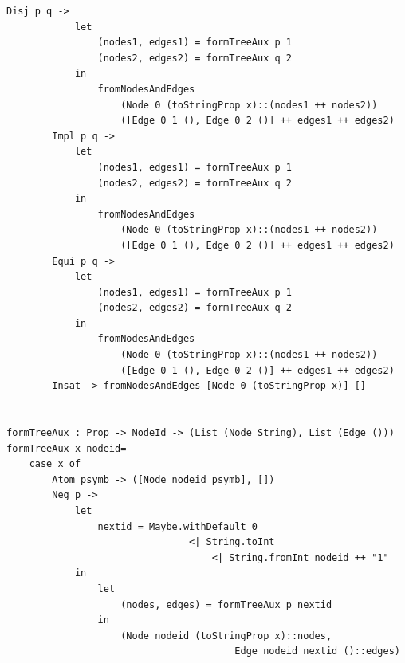 \documentclass[a4paper]{report}
\begin{document}
\begin{lstlisting}[caption={Módulo SintaxSemanticsLP}, mathescape=true]
        Disj p q -> 
            let 
                (nodes1, edges1) = formTreeAux p 1
                (nodes2, edges2) = formTreeAux q 2
            in
                fromNodesAndEdges 
                    (Node 0 (toStringProp x)::(nodes1 ++ nodes2)) 
                    ([Edge 0 1 (), Edge 0 2 ()] ++ edges1 ++ edges2)
        Impl p q -> 
            let 
                (nodes1, edges1) = formTreeAux p 1
                (nodes2, edges2) = formTreeAux q 2
            in
                fromNodesAndEdges 
                    (Node 0 (toStringProp x)::(nodes1 ++ nodes2)) 
                    ([Edge 0 1 (), Edge 0 2 ()] ++ edges1 ++ edges2)
        Equi p q -> 
            let 
                (nodes1, edges1) = formTreeAux p 1
                (nodes2, edges2) = formTreeAux q 2
            in
                fromNodesAndEdges 
                    (Node 0 (toStringProp x)::(nodes1 ++ nodes2)) 
                    ([Edge 0 1 (), Edge 0 2 ()] ++ edges1 ++ edges2)
        Insat -> fromNodesAndEdges [Node 0 (toStringProp x)] []


formTreeAux : Prop -> NodeId -> (List (Node String), List (Edge ()))
formTreeAux x nodeid=
    case x of
        Atom psymb -> ([Node nodeid psymb], [])
        Neg p -> 
            let 
                nextid = Maybe.withDefault 0 
                                <| String.toInt 
                                    <| String.fromInt nodeid ++ "1" 
            in
                let 
                    (nodes, edges) = formTreeAux p nextid 
                in
                    (Node nodeid (toStringProp x)::nodes, 
                                        Edge nodeid nextid ()::edges)                               
        

\end{lstlisting}
\end{document}
